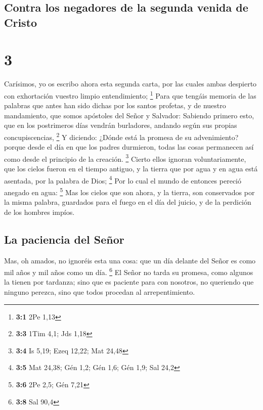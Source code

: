 \hypertarget{contra-los-negadores-de-la-segunda-venida-de-cristo}{%
\subsection{Contra los negadores de la segunda venida de
Cristo}\label{contra-los-negadores-de-la-segunda-venida-de-cristo}}

\hypertarget{section-2}{%
\section{3}\label{section-2}}

 Carísimos, yo os escribo ahora esta segunda carta, por
las cuales ambas despierto con exhortación vuestro limpio entendimiento;
\footnote{\textbf{3:1} 2Pe 1,13}  Para que tengáis memoria
de las palabras que antes han sido dichas por los santos profetas, y de
nuestro mandamiento, que somos apóstoles del Señor y Salvador:
 Sabiendo primero esto, que en los postrimeros días
vendrán burladores, andando según sus propias concupiscencias,
\footnote{\textbf{3:3} 1Tim 4,1; Jds 1,18}  Y diciendo:
¿Dónde está la promesa de su advenimiento? porque desde el día en que
los padres durmieron, todas las cosas permanecen así como desde el
principio de la creación. \footnote{\textbf{3:4} Is 5,19; Ezeq 12,22;
  Mat 24,48}  Cierto ellos ignoran voluntariamente, que
los cielos fueron en el tiempo antiguo, y la tierra que por agua y en
agua está asentada, por la palabra de Dios; \footnote{\textbf{3:5} Mat
  24,38; Gén 1,2; Gén 1,6; Gén 1,9; Sal 24,2}  Por lo cual
el mundo de entonces pereció anegado en agua: \footnote{\textbf{3:6} 2Pe
  2,5; Gén 7,21}  Mas los cielos que son ahora, y la
tierra, son conservados por la misma palabra, guardados para el fuego en
el día del juicio, y de la perdición de los hombres impíos.

\hypertarget{la-paciencia-del-seuxf1or}{%
\subsection{La paciencia del Señor}\label{la-paciencia-del-seuxf1or}}

 Mas, oh amados, no ignoréis esta una cosa: que un día
delante del Señor es como mil años y mil años como un día. \footnote{\textbf{3:8}
  Sal 90,4}  El Señor no tarda su promesa, como algunos la
tienen por tardanza; sino que es paciente para con nosotros, no
queriendo que ninguno perezca, sino que todos procedan al
arrepentimiento.

